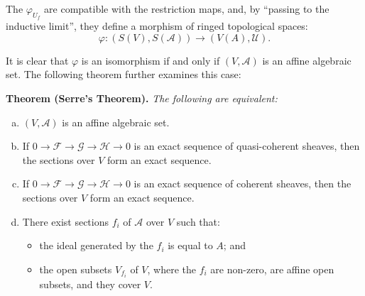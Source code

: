 \documentclass{article}
\newenvironment{itenv}[1]
  {\par\medskip\noindent\textbf{#1.}\itshape}
  {\medskip}
\newcommand{\scr}[1]{{\mathscr{#1}}}
\newcommand{\oldpage}[1]{\marginpar{\footnotesize$\Big\vert$ \textit{p.~#1}}}
\begin{document}
The $\varphi_{U_f}$ are compatible with the restriction maps, and, by ``passing to the inductive limit'', they define a morphism of ringed topological spaces:
\oldpage{2-05}
\[
  \varphi\colon (S(V),S(\scr{A})) \to (V(A),\scr{U}).
\]

It is clear that $\varphi$ is an isomorphism if and only if $(V,\scr{A})$ is an affine algebraic set.
The following theorem further examines this case:

\begin{itenv}{Theorem (Serre's Theorem)}
  The following are equivalent:
  \begin{enumerate}[(a)]
    \item $(V,\scr{A})$ is an affine algebraic set.
    \item If $0\to\scr{F}\to\scr{G}\to\scr{H}\to0$ is an exact sequence of quasi-coherent sheaves, then the sections over $V$ form an exact sequence.
    \item If $0\to\scr{F}\to\scr{G}\to\scr{H}\to0$ is an exact sequence of coherent sheaves, then the sections over $V$ form an exact sequence.
    \item There exist sections $f_i$ of $\scr{A}$ over $V$ such that:
      \begin{itemize}
        \item the ideal generated by the $f_i$ is equal to $A$; and
        \item the open subsets $V_{f_i}$ of $V$, where the $f_i$ are non-zero, are affine open subsets, and they cover $V$.
      \end{itemize}
  \end{enumerate}
\end{itenv}
\end{document}
